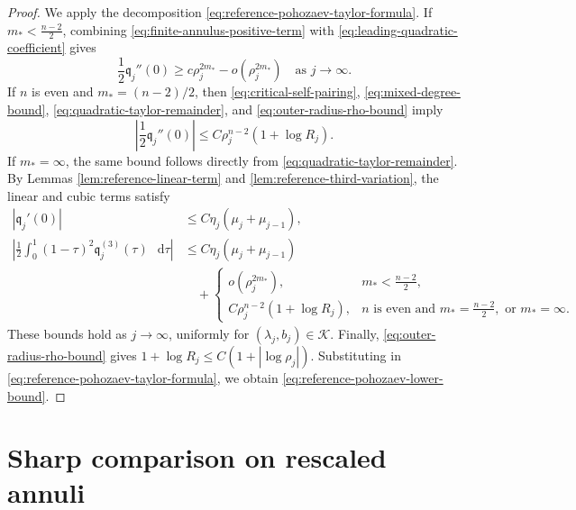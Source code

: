 \documentclass[11pt]{article}
\numberwithin{equation}{section}
\theoremstyle{remark}
\newcommand{\dd}{\mathop{}\!\mathrm{d}}
\begin{document}
\begin{proof}
We apply the decomposition \eqref{eq:reference-pohozaev-taylor-formula}.
{If \(m_*<\frac{n-2}{2}\), combining
\eqref{eq:finite-annulus-positive-term} with
\eqref{eq:leading-quadratic-coefficient} gives}
\[
 \frac12\mathfrak q_j''(0)
 \ge c\rho_j^{2m_*}-o(\rho_j^{2m_*})
 \quad\text{as }j\to\infty.
\]
{If \(n\) is even and \(m_*=(n-2)/2\), then
\eqref{eq:critical-self-pairing}, \eqref{eq:mixed-degree-bound},
\eqref{eq:quadratic-taylor-remainder}, and
\eqref{eq:outer-radius-rho-bound} imply}
\[
 \left|\frac12\mathfrak q_j''(0)\right|
 \le C\rho_j^{n-2}(1+\log R_j).
\]
{If \(m_*=\infty\), the same bound follows directly from
\eqref{eq:quadratic-taylor-remainder}.}
{By Lemmas  \ref{lem:reference-linear-term} and
\ref{lem:reference-third-variation}, the linear and cubic terms satisfy}
\[
 \begin{aligned}
 |\mathfrak q_j'(0)|
 &\le C\eta_j(\mu_j+\mu_{j-1}),\\
 \left|\frac12\int_0^1(1-\tau)^2
 \mathfrak q_j^{(3)}(\tau)\,\dd\tau\right|
 &\le C\eta_j(\mu_j+\mu_{j-1})\\
 &\quad+
 \begin{cases}
  o(\rho_j^{2m_*}),
  &m_*<\frac{n-2}{2},\\
  C\rho_j^{n-2}(1+\log R_j),
  &n\text{ is even and }m_*=\frac{n-2}{2},\text{ or }m_*=\infty.
  \end{cases}
 \end{aligned}
\]
These bounds hold as \(j\to\infty\), uniformly for
\((\lambda_j,b_j)\in\mathcal K\).
{Finally, \eqref{eq:outer-radius-rho-bound} gives
\(1+\log R_j\le C(1+|\log\rho_j|)\).}
{Substituting in
\eqref{eq:reference-pohozaev-taylor-formula}, we obtain
\eqref{eq:reference-pohozaev-lower-bound}.}
\end{proof}

\section{Sharp comparison on rescaled annuli}
\label{sec:exact-reference-comparison}
\end{document}
